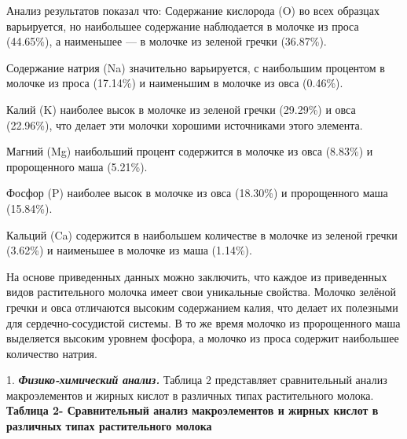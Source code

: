 \begin{multicols}{2}
Анализ результатов показал что: Содержание кислорода (O) во всех
образцах варьируется, но наибольшее содержание наблюдается в молочке из
проса (44.65\%), а наименьшее --- в молочке из зеленой гречки (36.87\%).

Содержание натрия (Na) значительно варьируется, с наибольшим процентом в
молочке из проса (17.14\%) и наименьшим в молочке из овса (0.46\%).

Калий (K) наиболее высок в молочке из зеленой гречки (29.29\%) и овса
(22.96\%), что делает эти молочки хорошими источниками этого элемента.

Магний (Mg) наибольший процент содержится в молочке из овса (8.83\%) и
пророщенного маша (5.21\%).

Фосфор (P) наиболее высок в молочке из овса (18.30\%) и пророщенного
маша (15.84\%).

Кальций (Ca) содержится в наибольшем количестве в молочке из зеленой
гречки (3.62\%) и наименьшее в молочке из маша (1.14\%).

На основе приведенных данных можно заключить, что каждое из приведенных
видов растительного молочка имеет свои уникальные свойства. Молочко
зелёной гречки и овса отличаются высоким содержанием калия, что делает
их полезными для сердечно-сосудистой системы. В то же время молочко из
пророщенного маша выделяется высоким уровнем фосфора, а молочко из проса
содержит наибольшее количество натрия.
\end{multicols}

1. \emph{{\bfseries Физико-химический анализ.}} Таблица 2 представляет
сравнительный анализ макроэлементов и жирных кислот в различных типах
растительного молока.
{\bfseries Таблица 2- Сравнительный анализ макроэлементов и жирных кислот в
различных типах растительного молока}

